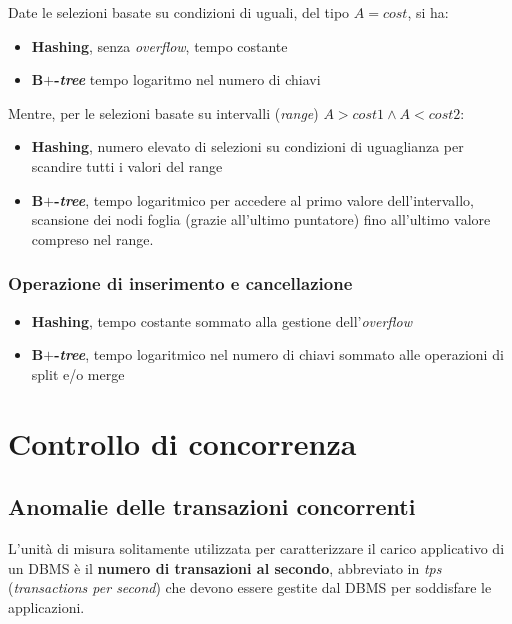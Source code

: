 \documentclass[a4paper]{article}
\begin{document}
	Date le selezioni basate su condizioni di uguali, del tipo $A = cost$, si ha:
	\begin{itemize}
		\item \textbf{Hashing}, senza \emph{overflow}, tempo costante
		\item \textbf{B$\boldsymbol{+}$-\emph{tree}} tempo logaritmo nel numero di chiavi
	\end{itemize}
	Mentre, per le selezioni basate su intervalli (\emph{range}) $A > cost1 \land A < cost2$:
	\begin{itemize}
		\item \textbf{Hashing}, numero elevato di selezioni su condizioni di uguaglianza per scandire tutti i valori del range
		\item \textbf{B$\boldsymbol{+}$-\emph{tree}}, tempo logaritmico per accedere al primo valore dell'intervallo, scansione dei nodi foglia (grazie all'ultimo puntatore) fino all'ultimo valore compreso nel range.
	\end{itemize}

	\subsubsection[Operazione di inserimento e cancellazione]{\textcolor{Red3}{Operazione di inserimento e cancellazione}}
	
	\begin{itemize}
		\item \textbf{Hashing}, tempo costante sommato alla gestione dell'\emph{overflow}
		\item \textbf{B$\boldsymbol{+}$-\emph{tree}}, tempo logaritmico nel numero di chiavi sommato alle operazioni di split e/o merge
	\end{itemize}\newpage

	\section{Controllo di concorrenza}
	
	\subsection{Anomalie delle transazioni concorrenti}\label{par: anomalie delle transazioni concorrenti}
	
	L'unità di misura solitamente utilizzata per caratterizzare il carico applicativo di un DBMS è il \textbf{numero di transazioni al secondo}, abbreviato in \emph{tps} (\emph{transactions per second}) che devono essere gestite dal DBMS per soddisfare le applicazioni.
	
\end{document}

